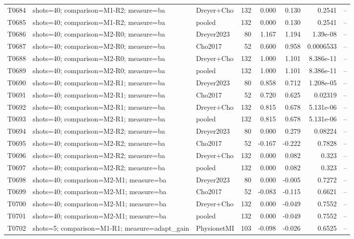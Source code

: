 \begin{longtable}{p{.45in}p{2.6in}p{.75in}rrrrr}
T0684 & shots=40; comparison=M1-R2; measure=ba & Dreyer+Cho & 132 & 0.000 & 0.130 & 0.2541 & -- \\
T0685 & shots=40; comparison=M1-R2; measure=ba & pooled & 132 & 0.000 & 0.130 & 0.2541 & -- \\
T0686 & shots=40; comparison=M2-R0; measure=ba & Dreyer2023 & 80 & 1.167 & 1.194 & 1.39e-08 & -- \\
T0687 & shots=40; comparison=M2-R0; measure=ba & Cho2017 & 52 & 0.600 & 0.958 & 0.0006533 & -- \\
T0688 & shots=40; comparison=M2-R0; measure=ba & Dreyer+Cho & 132 & 1.000 & 1.101 & 8.386e-11 & -- \\
T0689 & shots=40; comparison=M2-R0; measure=ba & pooled & 132 & 1.000 & 1.101 & 8.386e-11 & -- \\
T0690 & shots=40; comparison=M2-R1; measure=ba & Dreyer2023 & 80 & 0.858 & 0.712 & 1.208e-05 & -- \\
T0691 & shots=40; comparison=M2-R1; measure=ba & Cho2017 & 52 & 0.720 & 0.625 & 0.02319 & -- \\
T0692 & shots=40; comparison=M2-R1; measure=ba & Dreyer+Cho & 132 & 0.815 & 0.678 & 5.131e-06 & -- \\
T0693 & shots=40; comparison=M2-R1; measure=ba & pooled & 132 & 0.815 & 0.678 & 5.131e-06 & -- \\
T0694 & shots=40; comparison=M2-R2; measure=ba & Dreyer2023 & 80 & 0.000 & 0.279 & 0.08224 & -- \\
T0695 & shots=40; comparison=M2-R2; measure=ba & Cho2017 & 52 & -0.167 & -0.222 & 0.7828 & -- \\
T0696 & shots=40; comparison=M2-R2; measure=ba & Dreyer+Cho & 132 & 0.000 & 0.082 & 0.323 & -- \\
T0697 & shots=40; comparison=M2-R2; measure=ba & pooled & 132 & 0.000 & 0.082 & 0.323 & -- \\
T0698 & shots=40; comparison=M2-M1; measure=ba & Dreyer2023 & 80 & 0.000 & -0.005 & 0.7272 & -- \\
T0699 & shots=40; comparison=M2-M1; measure=ba & Cho2017 & 52 & -0.083 & -0.115 & 0.6621 & -- \\
T0700 & shots=40; comparison=M2-M1; measure=ba & Dreyer+Cho & 132 & 0.000 & -0.049 & 0.7552 & -- \\
T0701 & shots=40; comparison=M2-M1; measure=ba & pooled & 132 & 0.000 & -0.049 & 0.7552 & -- \\
T0702 & shots=5; comparison=M1-R1; measure=adapt\_\allowbreak{}gain & PhysionetMI & 103 & -0.098 & -0.026 & 0.6525 & -- \\

\end{longtable}
